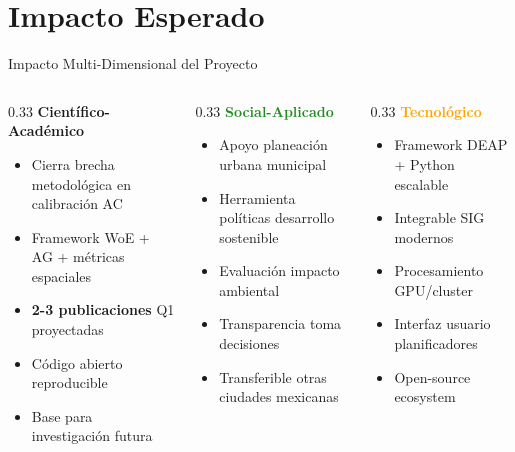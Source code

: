 \documentclass[aspectratio=169]{beamer}
\begin{document}
\section{Impacto Esperado}

\begin{frame}{Impacto Multi-Dimensional del Proyecto}
  \begin{columns}[T]
    \begin{column}{0.33\textwidth}
      \textcolor{UNAMBlue}{\textbf{Científico-Académico}}
      \begin{itemize}
        \item Cierra brecha metodológica en calibración AC
        \item Framework WoE + AG + métricas espaciales  
        \item \textbf{2-3 publicaciones} Q1 proyectadas
        \item Código abierto reproducible
        \item Base para investigación futura
      \end{itemize}
    \end{column}
    \begin{column}{0.33\textwidth}
      \textcolor{ForestGreen}{\textbf{Social-Aplicado}}
      \begin{itemize}
        \item Apoyo planeación urbana municipal
        \item Herramienta políticas desarrollo sostenible
        \item Evaluación impacto ambiental
        \item Transparencia toma decisiones  
        \item Transferible otras ciudades mexicanas
      \end{itemize}
    \end{column}
    \begin{column}{0.33\textwidth}
      \textcolor{Orange}{\textbf{Tecnológico}}
      \begin{itemize}
        \item Framework DEAP + Python escalable
        \item Integrable SIG modernos
        \item Procesamiento GPU/cluster
        \item Interfaz usuario planificadores
        \item Open-source ecosystem
      \end{itemize}
    \end{column}
  \end{columns}
\end{frame}
\end{document}
